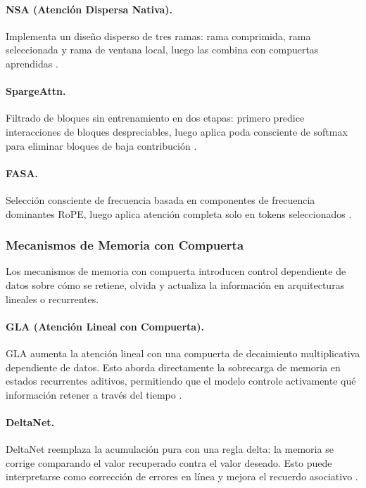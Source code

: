 \documentclass[11pt,a4paper]{article}
\begin{document}
\paragraph{NSA (Atención Dispersa Nativa).}
Implementa un diseño disperso de tres ramas: rama comprimida, rama seleccionada y rama de ventana local, luego las combina con compuertas aprendidas \citep{yuan_nsa_2025}.

\paragraph{SpargeAttn.}
Filtrado de bloques sin entrenamiento en dos etapas: primero predice interacciones de bloques despreciables, luego aplica poda consciente de softmax para eliminar bloques de baja contribución \citep{zhang_spargeattn_2025}.

\paragraph{FASA.}
Selección consciente de frecuencia basada en componentes de frecuencia dominantes RoPE, luego aplica atención completa solo en tokens seleccionados \citep{wang_fasa_2026}.

\subsubsection{Mecanismos de Memoria con Compuerta}

Los mecanismos de memoria con compuerta introducen control dependiente de datos sobre cómo se retiene, olvida y actualiza la información en arquitecturas lineales o recurrentes.

\paragraph{GLA (Atención Lineal con Compuerta).}
GLA aumenta la atención lineal con una compuerta de decaimiento multiplicativa dependiente de datos. Esto aborda directamente la sobrecarga de memoria en estados recurrentes aditivos, permitiendo que el modelo controle activamente qué información retener a través del tiempo \citep{yang_gla_2023}.

\paragraph{DeltaNet.}
DeltaNet reemplaza la acumulación pura con una regla delta: la memoria se corrige comparando el valor recuperado contra el valor deseado. Esto puede interpretarse como corrección de errores en línea y mejora el recuerdo asociativo \citep{yang_deltanet_2024}.
\end{document}
